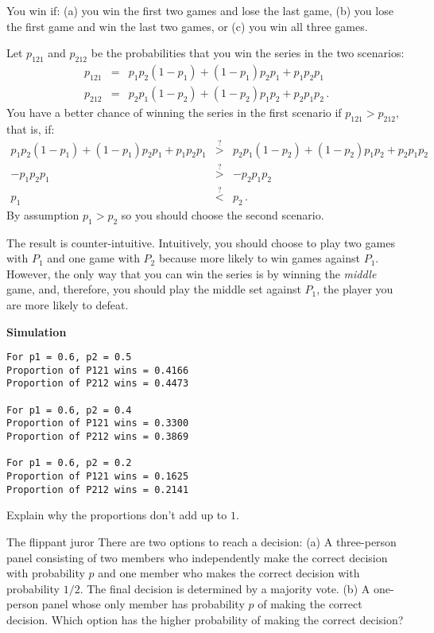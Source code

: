 
You win if: (a) you win the first two games and lose the last game, (b) you lose the first game and win the last two games, or (c) you win all three games.

Let $p_{121}$ and $p_{212}$ be the probabilities that you win the series in the two scenarios:
\begin{eqnarray*}
p_{121}&=&p_1p_2(1-p_1) + (1-p_1)p_2p_1 + p_1p_2p_1\\
p_{212}&=&p_2p_1(1-p_2) + (1-p_2)p_1p_2 + p_2p_1p_2\,.
\end{eqnarray*}
You have a better chance of winning the series in the first scenario if $p_{121}>p_{212}$, that is, if:
\begin{eqnarray*}
p_1p_2(1-p_1) + (1-p_1)p_2p_1 + p_1p_2p_1 &\stackrel{?}{>}& 
p_2p_1(1-p_2) + (1-p_2)p_1p_2 + p_2p_1p_2\\
-p_1p_2p_1 & \stackrel{?}{>}& -p_2p_1p_2\\
p_1&\stackrel{?}{<}&p_2\,.
\end{eqnarray*}
By assumption $p_1>p_2$ so you should choose the second scenario.


The result is counter-intuitive. Intuitively, you should choose to play two games with $P_1$ and one game with $P_2$ because more likely to win games against $P_1$. However, the only way that you can win the series is by winning the \emph{middle} game, and, therefore, you should play the middle set against $P_1$, the player you are more likely to defeat.

\textbf{Simulation}
\begin{verbatim}
For p1 = 0.6, p2 = 0.5
Proportion of P121 wins = 0.4166
Proportion of P212 wins = 0.4473

For p1 = 0.6, p2 = 0.4
Proportion of P121 wins = 0.3300
Proportion of P212 wins = 0.3869

For p1 = 0.6, p2 = 0.2
Proportion of P121 wins = 0.1625
Proportion of P212 wins = 0.2141
\end{verbatim}
Explain why the proportions don't add up to $1$.


\begin{prob}{The flippant juror}
There are two options to reach a decision: (a) A three-person panel consisting of two members who independently make the correct decision with probability $p$ and one member who makes the correct decision with probability $1/2$. The final decision is determined by a majority vote. (b) A one-person panel whose only member has probability $p$ of making the correct decision. Which option has the higher probability of making the correct decision?
\end{prob}

